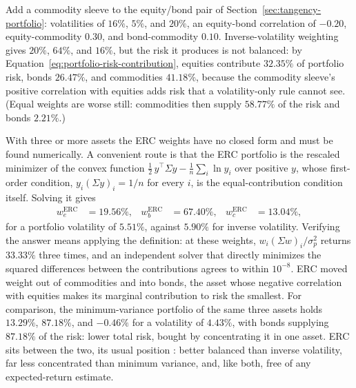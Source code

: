 \documentclass[../ai_in_finance]{subfiles}
\begin{document}

Add a commodity sleeve to the equity/bond pair of Section~\ref{sec:tangency-portfolio}: volatilities of $16\%$, $5\%$, and $20\%$, an equity-bond correlation of $-0.20$, equity-commodity $0.30$, and bond-commodity $0.10$. Inverse-volatility weighting gives $20\%$, $64\%$, and $16\%$, but the risk it produces is not balanced: by Equation~\eqref{eq:portfolio-risk-contribution}, equities contribute $32.35\%$ of portfolio risk, bonds $26.47\%$, and commodities $41.18\%$, because the commodity sleeve's positive correlation with equities adds risk that a volatility-only rule cannot see. (Equal weights are worse still: commodities then supply $58.77\%$ of the risk and bonds $2.21\%$.)

With three or more assets the ERC weights have no closed form and must be found numerically. A convenient route is that the ERC portfolio is the rescaled minimizer of the convex function $\tfrac12\, y^\top\Sigma y - \tfrac1n\sum_i \ln y_i$ over positive $y$, whose first-order condition, $y_i(\Sigma y)_i = 1/n$ for every $i$, is the equal-contribution condition itself. Solving it gives
\begin{align*}
w_e^{\text{ERC}} &= 19.56\%, & w_b^{\text{ERC}} &= 67.40\%, & w_c^{\text{ERC}} &= 13.04\%,
\end{align*}
for a portfolio volatility of $5.51\%$, against $5.90\%$ for inverse volatility. Verifying the answer means applying the definition: at these weights, $w_i(\Sigma w)_i/\sigma_p^2$ returns $33.33\%$ three times, and an independent solver that directly minimizes the squared differences between the contributions agrees to within $10^{-8}$. ERC moved weight out of commodities and into bonds, the asset whose negative correlation with equities makes its marginal contribution to risk the smallest. For comparison, the minimum-variance portfolio of the same three assets holds $13.29\%$, $87.18\%$, and $-0.46\%$ for a volatility of $4.43\%$, with bonds supplying $87.18\%$ of the risk: lower total risk, bought by concentrating it in one asset. ERC sits between the two, its usual position \parencite{maillard2010properties}: better balanced than inverse volatility, far less concentrated than minimum variance, and, like both, free of any expected-return estimate.
\end{document}

